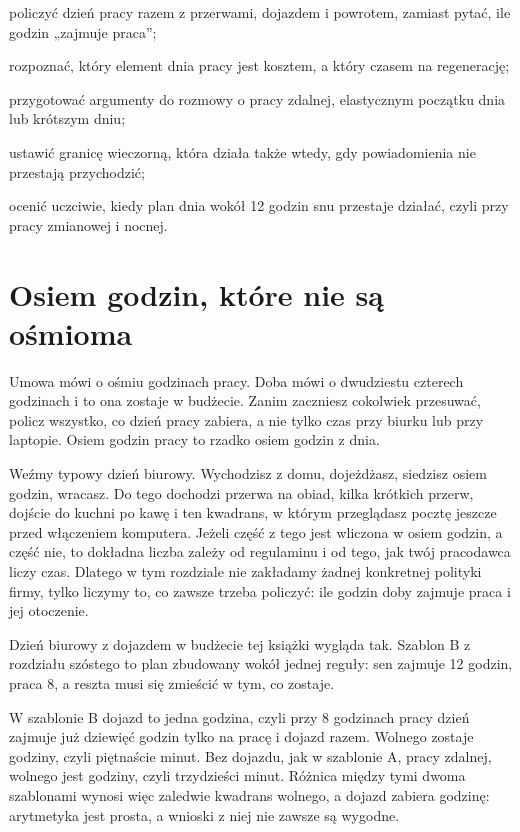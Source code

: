 
\begin{cele}
\item policzyć dzień pracy razem z przerwami, dojazdem i powrotem, zamiast pytać, ile godzin „zajmuje praca”;
\item rozpoznać, który element dnia pracy jest kosztem, a który czasem na regenerację;
\item przygotować argumenty do rozmowy o pracy zdalnej, elastycznym początku dnia lub krótszym dniu;
\item ustawić granicę wieczorną, która działa także wtedy, gdy powiadomienia nie przestają przychodzić;
\item ocenić uczciwie, kiedy plan dnia wokół 12 godzin snu przestaje działać, czyli przy pracy zmianowej i nocnej.
\end{cele}

\section{Osiem godzin, które nie są ośmioma}

Umowa mówi o ośmiu godzinach pracy. Doba mówi o dwudziestu czterech godzinach i to ona zostaje w budżecie. Zanim zaczniesz cokolwiek przesuwać, policz wszystko, co dzień pracy zabiera, a nie tylko czas przy biurku lub przy laptopie. Osiem godzin pracy to rzadko osiem godzin z dnia.

Weźmy typowy dzień biurowy. Wychodzisz z domu, dojeżdżasz, siedzisz osiem godzin, wracasz. Do tego dochodzi przerwa na obiad, kilka krótkich przerw, dojście do kuchni po kawę i ten kwadrans, w którym przeglądasz pocztę jeszcze przed włączeniem komputera. Jeżeli część z tego jest wliczona w osiem godzin, a część nie, to dokładna liczba zależy od regulaminu i od tego, jak twój pracodawca liczy czas. Dlatego w tym rozdziale nie zakładamy żadnej konkretnej polityki firmy, tylko liczymy to, co zawsze trzeba policzyć: ile godzin doby zajmuje praca i jej otoczenie.

Dzień biurowy z dojazdem w budżecie tej książki wygląda tak. Szablon B z rozdziału szóstego to plan zbudowany wokół jednej reguły: sen zajmuje 12 godzin, praca 8, a reszta musi się zmieścić w tym, co zostaje.


W szablonie B dojazd to jedna godzina, czyli przy 8 godzinach pracy dzień zajmuje już dziewięć godzin tylko na pracę i dojazd razem. Wolnego zostaje  godziny, czyli piętnaście minut. Bez dojazdu, jak w szablonie A, pracy zdalnej, wolnego jest  godziny, czyli trzydzieści minut. Różnica między tymi dwoma szablonami wynosi więc zaledwie kwadrans wolnego, a dojazd zabiera godzinę: arytmetyka jest prosta, a wnioski z niej nie zawsze są wygodne.

